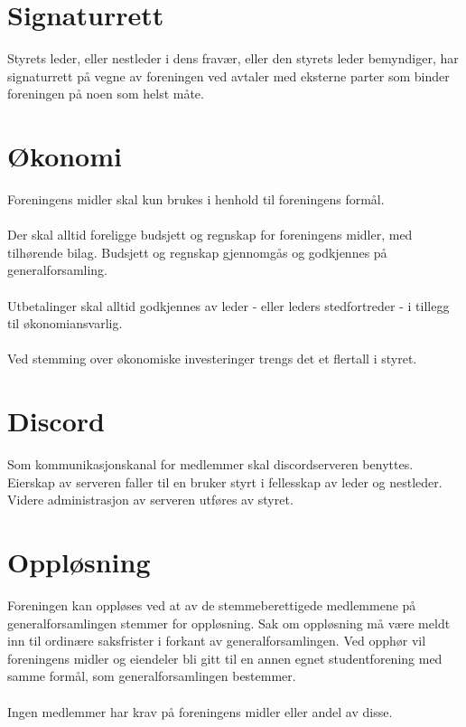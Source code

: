 \documentclass[12pt,a4paper,norsk]{article}
\begin{document}
\section{Signaturrett}

Styrets leder, eller nestleder i dens fravær, eller den styrets leder bemyndiger, har signaturrett
på vegne av foreningen ved avtaler med eksterne parter som binder foreningen på noen som
helst måte.



\section{Økonomi}

Foreningens midler skal kun brukes i henhold til foreningens formål.
\\
\\
Der skal alltid foreligge budsjett og regnskap for foreningens midler, med tilhørende bilag.
Budsjett og regnskap gjennomgås og godkjennes på generalforsamling.
\\
\\
Utbetalinger skal alltid godkjennes av leder - eller leders stedfortreder - i tillegg til
økonomiansvarlig.
\\
\\
Ved stemming over økonomiske investeringer trengs det et  flertall i styret.



\section{Discord}

Som kommunikasjonskanal for medlemmer skal discordserveren  benyttes.
Eierskap av serveren faller til en bruker styrt i fellesskap av leder og nestleder. Videre administrasjon av
serveren utføres av styret.



\section{Oppløsning}

Foreningen kan oppløses ved at  av de stemmeberettigede medlemmene på
generalforsamlingen stemmer for oppløsning. Sak om oppløsning må være meldt inn til
ordinære saksfrister i forkant av generalforsamlingen. Ved opphør vil foreningens midler og
eiendeler bli gitt til en annen egnet studentforening med samme formål, som
generalforsamlingen bestemmer.
\\
\\
Ingen medlemmer har krav på foreningens midler eller andel av disse.
\end{document}
